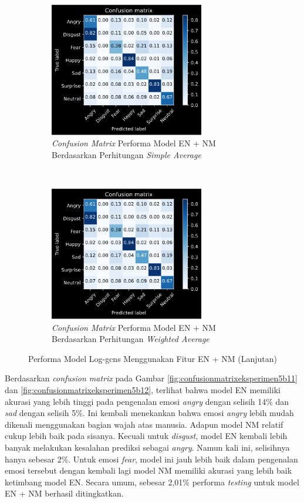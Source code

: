 \begin{figure}[t]
    \ContinuedFloat
    \centering
    \begin{subfigure}[t]{6.75cm}
        \includegraphics[width=6.75cm]{gambar/eksperimen5b1_matriks3.png}
        \caption{\textit{Confusion Matrix} Performa Model EN + NM Berdasarkan Perhitungan \textit{Simple Average}}
        \label{fig:confusionmatrixeksperimen5b13}
    \end{subfigure}
    ~~~
    \begin{subfigure}[t]{6.75cm}
        \includegraphics[width=6.75cm]{gambar/eksperimen5b1_matriks4.png}
        \caption{\textit{Confusion Matrix} Performa Model EN + NM Berdasarkan Perhitungan \textit{Weighted Average}}
        \label{fig:confusionmatrixeksperimen5b14}
    \end{subfigure}
    \caption{Performa Model Log-\acrshort{gcns} Menggunakan Fitur EN + NM (Lanjutan)}
\end{figure}
Berdasarkan \textit{confusion matrix} pada Gambar \ref{fig:confusionmatrixeksperimen5b11} dan \ref{fig:confusionmatrixeksperimen5b12}, terlihat bahwa model EN memiliki akurasi yang lebih tinggi pada pengenalan emosi \textit{angry} dengan selisih 14\% dan \textit{sad} dengan selisih 5\%. Ini kembali menekankan bahwa emosi \textit{angry} lebih mudah dikenali menggunakan bagian wajah atas manusia. Adapun model NM relatif cukup lebih baik pada sisanya. Kecuali untuk \textit{disgust}, model EN kembali lebih banyak melakukan kesalahan prediksi sebagai \textit{angry}. Namun kali ini, selisihnya hanya sebesar 2\%. Untuk emosi \textit{fear}, model ini jauh lebih baik dalam pengenalan emosi tersebut dengan kembali lagi model NM memiliki akurasi yang lebih baik ketimbang model EN. Secara umum, sebesar 2,01\% performa \textit{testing}  untuk model EN + NM berhasil ditingkatkan.

